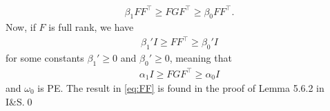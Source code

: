 \documentclass[]{article}
\begin{document}
\begin{equation}\begin{aligned}
\beta_1 FF^\top \geq F G F^\top \geq \beta_0 FF^\top.
\end{aligned}\end{equation}
Now, if $F$ is full rank, we have
\begin{equation}\begin{aligned}
\label{eq:FF}
\beta_1'I \geq FF^\top \geq \beta_0'I
\end{aligned}\end{equation}
for some constants $\beta_1' \geq 0$ and $\beta_0' \geq 0$, meaning that
\begin{equation}\begin{aligned}
\alpha_1 I \geq F G F^\top \geq \alpha_0I
\end{aligned}\end{equation}
and $\omega_0$ is PE. The result in \eqref{eq:FF} is found in the proof of Lemma 5.6.2 in I\&S.\qed
\end{document}
